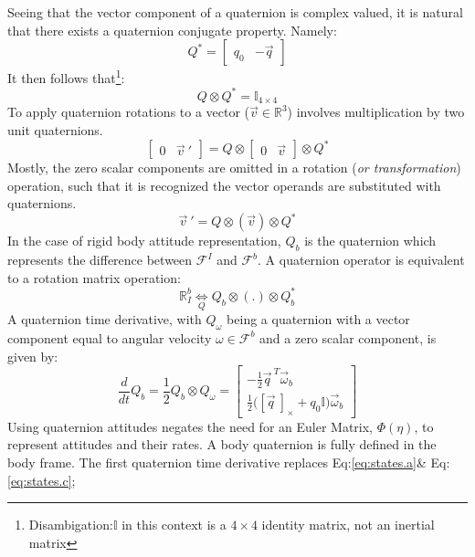 Seeing that the vector component of a quaternion is complex valued, it is natural that there exists a quaternion conjugate property. Namely:
\begin{equation}
Q^*=\begin{bmatrix}
q_0 & -\vec{q}
\end{bmatrix}
\end{equation}
It then follows that\footnote{Disambigation:$\mathbb{I}$ in this context is a $4\times 4$ identity matrix, not an inertial matrix}:
\begin{equation}
Q\otimes Q^* = \mathbb{I}_{4\times 4}
\end{equation}
To apply quaternion rotations to a vector ($\vec{v} \in\mathbb{R}^3$) involves multiplication by two unit quaternions. 
\begin{equation}
\begin{bmatrix}
0 & \vec{v}~'
\end{bmatrix}
=Q\otimes
\begin{bmatrix}
0 & \vec{v}
\end{bmatrix}
\otimes Q^*
\end{equation}
Mostly, the zero scalar components are omitted in a rotation (\emph{or transformation}) operation, such that it is recognized the vector operands are substituted with quaternions.
\begin{equation}
\vec{v}~'=Q \otimes (\vec{v}) \otimes Q^*
\end{equation} 
In the case of rigid body attitude representation, $Q_b$ is the quaternion which represents the difference between $\mathcal{F}^I$ and $\mathcal{F}^b$. A quaternion operator is equivalent to a rotation matrix operation:
\begin{equation}
\mathbb{R}_I^b \underset{Q}{\iff} Q_b \otimes (.) \otimes Q_b^*
\end{equation}
A quaternion time derivative, with $Q_\omega$ being a quaternion with a vector component equal to angular velocity $\omega\in\mathcal{F}^b$ and a zero scalar component, is given by:
\begin{equation}
\frac{d}{dt}Q_b=\frac{1}{2}Q_b\otimes Q_{\omega}=\begin{bmatrix}
-\frac{1}{2}\vec{q}^{~T} \vec{\omega}_b\\
\frac{1}{2}\big([\vec{q}~]_\times+q_0\mathbb{I}\big)\vec{\omega}_b
\end{bmatrix}
\end{equation}
\newpage
Using quaternion attitudes negates the need for an Euler Matrix, $\Phi(\eta)$, to represent attitudes and their rates. A body quaternion is fully defined in the body frame. The first quaternion time derivative replaces Eq:\ref{eq:states.a}\& Eq:\ref{eq:states.c};
